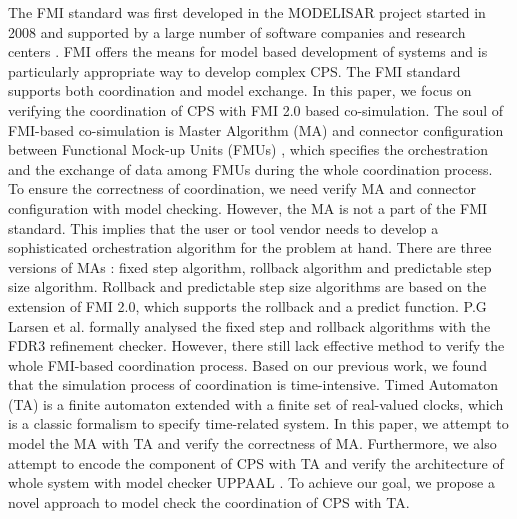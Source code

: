 The FMI standard was first developed in the MODELISAR project started in 2008 and supported by a large number of software companies and research centers \cite{ClauMODELISAR}. FMI offers the means for model based development of systems and is particularly appropriate way to develop complex CPS. The FMI standard supports both coordination and  model exchange. In this paper, we focus on verifying the coordination of CPS with FMI 2.0 based co-simulation.
The soul of FMI-based co-simulation is Master Algorithm (MA) \cite{AckerDVM15} and connector configuration between Functional Mock-up Units (FMUs) \cite{Tripakis15}, which specifies the orchestration and the exchange of data among FMUs during the whole coordination process. To ensure the correctness of coordination, we need verify MA and connector configuration with model checking. However, the MA is not a part of the FMI standard. This implies that the user or tool vendor needs to develop a sophisticated orchestration algorithm for the problem at hand. 
There are three versions of MAs \cite{BromanBGLMTW13}: fixed step algorithm, rollback algorithm and predictable step size algorithm. Rollback and predictable step size algorithms are based on the extension of FMI 2.0, which supports the rollback and a predict function. P.G Larsen et al. \cite{Larsen2016Integrated} formally analysed the fixed step and rollback algorithms with the FDR3 refinement checker. However, there still lack effective method to verify the whole FMI-based coordination process. Based on our previous work, we found that the simulation process of coordination is time-intensive. Timed Automaton (TA) \cite{BehrmannDLHPYH06} is a finite automaton extended with a finite set of real-valued clocks, which is a classic formalism to specify time-related system. In this paper, we attempt to model the MA with TA and verify the correctness of MA. Furthermore, we also attempt to encode the component of CPS with TA and verify the architecture of whole system with model checker UPPAAL \cite{BehrmannDLHPYH06}. To achieve our goal, we propose a novel approach to model check the coordination of CPS with TA.

